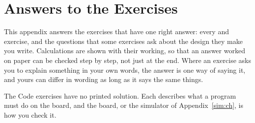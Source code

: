 
\chapter{Answers to the Exercises}
\label{app:answers}

This appendix answers the exercises that have one right answer: every 
and  exercise, and the questions that some
 exercises ask about the design they make you write. Calculations are shown with
their working, so that an answer worked on paper can be checked step by step, not just at the end.
Where an exercise asks you to explain something in your own words, the answer is one way of saying
it, and yours can differ in wording as long as it says the same things.

The Code exercises have no printed solution. Each describes what a program must do on the board,
and the board, or the simulator of Appendix~\ref{sim:ch}, is how you check it.











